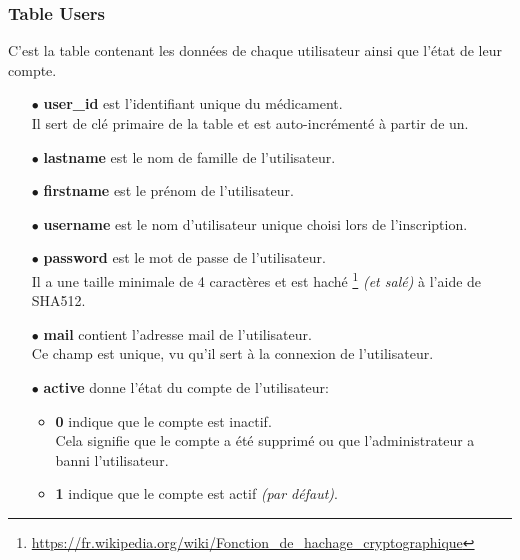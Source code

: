 \newpage

\subsubsection{Table Users}
\label{sec:table-users}

C'est la table contenant les données de chaque utilisateur ainsi que l'état de leur compte.\\

\begin{itemize}
    
    \item[$\bullet$] \textbf{user\_id} est l'identifiant unique du médicament.\\
    Il sert de clé primaire de la table et est auto-incrémenté à partir de un.
    
    \item[$\bullet$] \textbf{lastname} est le nom de famille de l'utilisateur.
    
    \item[$\bullet$] \textbf{firstname} est le prénom de l'utilisateur.
    
    \item[$\bullet$] \textbf{username} est le nom d'utilisateur unique choisi lors de l'inscription.
    
    \item[$\bullet$] \textbf{password} est le mot de passe de l'utilisateur.\\
    Il a une taille minimale de 4 caractères et est haché \footnote{\url{https://fr.wikipedia.org/wiki/Fonction\_de\_hachage\_cryptographique}} \textit{(et salé)} à l'aide de SHA512.
    
    \item[$\bullet$] \textbf{mail} contient l'adresse mail de l'utilisateur.\\
    Ce champ est unique, vu qu'il sert à la connexion de l'utilisateur.
    
    \item[$\bullet$] \textbf{active} donne l'état du compte de l'utilisateur:
    
    \begin{itemize}
        
        \item \textbf{0} indique que le compte est inactif.\\
        Cela signifie que le compte a été supprimé ou que l'administrateur a banni l'utilisateur.
        
        \item \textbf{1} indique que le compte est actif \textit{(par défaut)}.
        
    \end{itemize}
    
\end{itemize}


